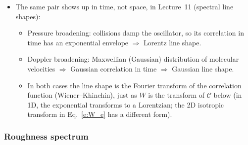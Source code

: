 \documentclass[11pt, oneside]{article}
\begin{document}
\begin{itemize}
\begin{itemize}
		\item Measured profiles smoothed by the instrument (finite laser spot or pin spacing) also lose their small scales and look more Gaussian near $r = 0$.
		\item In practice, the Gaussian is mostly an analytical convenience; it is rarely the best fit to natural microtopography, but it is needed for models that require finite slopes (e.g., the geometric optics result, Eq.~\eqref{e:go}).
	\end{itemize}
	\item The same pair shows up in time, not space, in Lecture~11 (spectral line shapes):
	\begin{itemize}
		\item Pressure broadening: collisions damp the oscillator, so its correlation in time has an exponential envelope $\Rightarrow$ Lorentz line shape.
		\item Doppler broadening: Maxwellian (Gaussian) distribution of molecular velocities $\Rightarrow$ Gaussian correlation in time $\Rightarrow$ Gaussian line shape.
		\item In both cases the line shape is the Fourier transform of the correlation function (Wiener--Khinchin), just as $W$ is the transform of $\mathcal{C}$ below (in 1D, the exponential transforms to a Lorentzian; the 2D isotropic transform in Eq.~\eqref{e:W_e} has a different form).
	\end{itemize}
\end{itemize}

\subsubsection{Roughness spectrum}
\end{document}
